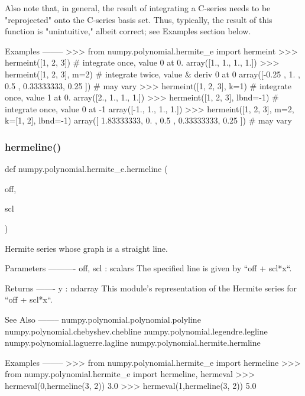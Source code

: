 \begin{DoxyVerb}
Also note that, in general, the result of integrating a C-series needs
to be "reprojected" onto the C-series basis set.  Thus, typically,
the result of this function is "unintuitive," albeit correct; see
Examples section below.

Examples
--------
>>> from numpy.polynomial.hermite_e import hermeint
>>> hermeint([1, 2, 3]) # integrate once, value 0 at 0.
array([1., 1., 1., 1.])
>>> hermeint([1, 2, 3], m=2) # integrate twice, value & deriv 0 at 0
array([-0.25      ,  1.        ,  0.5       ,  0.33333333,  0.25      ]) # may vary
>>> hermeint([1, 2, 3], k=1) # integrate once, value 1 at 0.
array([2., 1., 1., 1.])
>>> hermeint([1, 2, 3], lbnd=-1) # integrate once, value 0 at -1
array([-1.,  1.,  1.,  1.])
>>> hermeint([1, 2, 3], m=2, k=[1, 2], lbnd=-1)
array([ 1.83333333,  0.        ,  0.5       ,  0.33333333,  0.25      ]) # may vary\end{DoxyVerb}
 \mbox{\label{namespacenumpy_1_1polynomial_1_1hermite__e_afdaf2116be873126d2371dd6fce4a5d4}} 
\subsubsection{\texorpdfstring{hermeline()}{hermeline()}}
{\footnotesize\ttfamily def numpy.\+polynomial.\+hermite\+\_\+e.\+hermeline (\begin{DoxyParamCaption}\item[{}]{off,  }\item[{}]{scl }\end{DoxyParamCaption})}

\begin{DoxyVerb}Hermite series whose graph is a straight line.

Parameters
----------
off, scl : scalars
    The specified line is given by ``off + scl*x``.

Returns
-------
y : ndarray
    This module's representation of the Hermite series for
    ``off + scl*x``.

See Also
--------
numpy.polynomial.polynomial.polyline
numpy.polynomial.chebyshev.chebline
numpy.polynomial.legendre.legline
numpy.polynomial.laguerre.lagline
numpy.polynomial.hermite.hermline

Examples
--------
>>> from numpy.polynomial.hermite_e import hermeline
>>> from numpy.polynomial.hermite_e import hermeline, hermeval
>>> hermeval(0,hermeline(3, 2))
3.0
>>> hermeval(1,hermeline(3, 2))
5.0\end{DoxyVerb}
 \mbox{\label{namespacenumpy_1_1polynomial_1_1hermite__e_a90464e580ffd730a57afd64261d55e8a}} 
